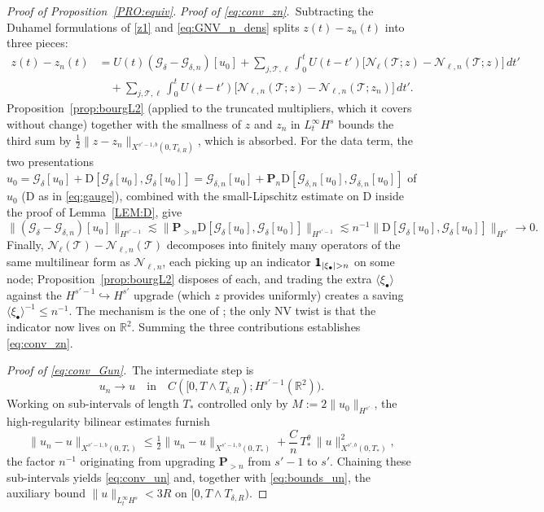 \documentclass[a4paper,
11pt,  reqno]{amsart}
\newcommand{\mathbbm}[1]{\mathchoice%
    {\hbox{\sffamily 1\kern-.40em 1}}%
    {\hbox{\sffamily 1\kern-.40em 1}}%
    {\hbox{\scriptsize\sffamily 1\kern-.30em 1}}%
    {\hbox{\tiny\sffamily 1\kern-.25em 1}}}%
\newcommand{\jap}[1]{\langle #1 \rangle}
\newcommand{\5}{\textup{V}}
\newcommand{\ind}{\mathbbm 1}
\newcommand{\dl}{\delta}
\theoremstyle{remark}
\newcommand{\R}{\mathbb{R}}
\newcommand{\bul}{\bullet}
\newcommand{\TT}{\mathcal{T}}
\renewcommand{\l}{\ell}
\newcommand{\Gc}{\mathcal{G}}
\numberwithin{equation}{section}
\numberwithin{theorem}{section}
\newcommand{\Ncal}{\mathcal{N}}
\newcommand{\D}{\mathrm{D}}
\begin{document}
\begin{proof}[Proof of Proposition~\textup{\ref{PRO:equiv}}]
\smallskip
\noindent\emph{Proof of \eqref{eq:conv_zn}.}\
Subtracting the Duhamel formulations of \eqref{z1} and
\eqref{eq:GNV_n_dens} splits $z(t)-z_n(t)$ into three pieces:
\begin{align*}
z(t)-z_n(t)
&= U(t)(\Gc_\dl-\Gc_{\dl,n})[u_0]
+ \sum_{j,\TT,\l}\!\int_0^t\! U(t-t')
\big[\Ncal_\l(\TT;z)-\Ncal_{\l,n}(\TT;z)\big]\,dt'
\\
&\quad
+ \sum_{j,\TT,\l}\!\int_0^t\! U(t-t')
\big[\Ncal_{\l,n}(\TT;z)-\Ncal_{\l,n}(\TT;z_n)\big]\,dt'.
\end{align*}
Proposition~\ref{prop:bourgL2} (applied to the truncated multipliers,
which it covers without change) together with the smallness of $z$
and $z_n$ in $L^\infty_t H^s$ bounds the third sum by
$\tfrac12\|z-z_n\|_{X^{s'-1,b}(0,T_{\dl,R})}$, which is absorbed.
For the data term, the two presentations
$u_0=\Gc_\dl[u_0]+\D[\Gc_\dl[u_0],\Gc_\dl[u_0]]
=\Gc_{\dl,n}[u_0]+\mathbf{P}_n\D[\Gc_{\dl,n}[u_0],\Gc_{\dl,n}[u_0]]$
of $u_0$ ($\D$ as in \eqref{eq:gauge}), combined with the
small-Lipschitz estimate on $\D$ inside the proof of
Lemma~\ref{LEM:D}, give
\[
\|(\Gc_\dl-\Gc_{\dl,n})[u_0]\|_{H^{s'-1}}
\lesssim \|\mathbf{P}_{>n}\D[\Gc_\dl[u_0],\Gc_\dl[u_0]]\|_{H^{s'-1}}
\lesssim n^{-1}\|\D[\Gc_\dl[u_0],\Gc_\dl[u_0]]\|_{H^{s'}}
\to 0.
\]
Finally, $\Ncal_\l(\TT)-\Ncal_{\l,n}(\TT)$ decomposes into finitely
many operators of the same multilinear form as $\Ncal_{\l,n}$,
each picking up an indicator $\ind_{|\xi_\bul|>n}$ on some node;
Proposition~\ref{prop:bourgL2} disposes of each, and trading the
extra $\jap{\xi_\bul}$ against the $H^{s'-1}\hookrightarrow H^{s'}$
upgrade (which $z$ provides uniformly) creates a saving
$\jap{\xi_\bul}^{-1}\le n^{-1}$. The mechanism is the one of
\cite{chcora}; the only NV twist is that the indicator now lives on
$\R^2$. Summing the three contributions establishes
\eqref{eq:conv_zn}.

\smallskip
\noindent\emph{Proof of \eqref{eq:conv_Gun}.}\
The intermediate step is
\begin{equation}\label{eq:conv_un}
u_n \to u \quad\text{in}\quad C([0,T\wedge T_{\dl,R}); H^{s'-1}(\R^2)).
\end{equation}
Working on sub-intervals of length $T_*$ controlled only by
$M:=2\|u_0\|_{H^{s'}}$, the high-regularity bilinear estimates
\cite{angelopolous,kazeykinamunoz1,kazeykinamunoz2} furnish
\[
\|u_n-u\|_{X^{s'-1,b}(0,T_*)}
\le \tfrac12\|u_n-u\|_{X^{s'-1,b}(0,T_*)}
+ \frac{C}{n}\,T_*^\theta\,\|u\|_{X^{s',b}(0,T_*)}^2,
\]
the factor $n^{-1}$ originating from upgrading $\mathbf{P}_{>n}$ from
$s'-1$ to $s'$. Chaining these sub-intervals yields
\eqref{eq:conv_un} and, together with \eqref{eq:bounds_un}, the
auxiliary bound $\|u\|_{L^\infty_t H^s}<3R$ on
$[0,T\wedge T_{\dl,R})$.


\end{proof}
\end{document}
